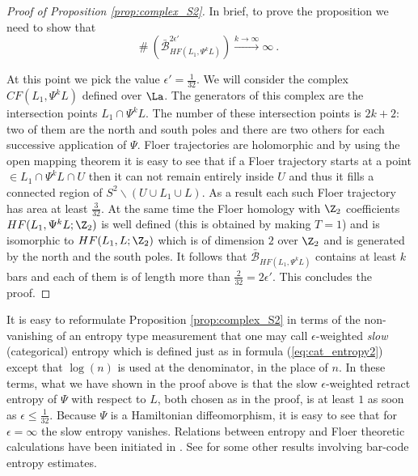 \begin{proof}[Proof of Proposition \ref{prop:complex_S2}]
 In brief, to prove the proposition we need to show that 
 \begin{equation}\label{eq:estimate_bars3}
 \#\  \left(\bar{\mathcal{B}}^{2\epsilon'}_{HF(L_{1},\Psi^{k}L)}\right)\stackrel{k\to\infty}{\longrightarrow} \infty ~.~
 \end{equation} 

At this point we pick the value  $\epsilon'= \frac{1}{32}$. We will consider the complex $CF(L_{1}, \Psi^{k}L)$ defined over $\La$. The generators of this complex  are the intersection points $L_{1}\cap \Psi^{k}L$. The number of these intersection points is $2k+2$: two of them
are the north and south poles and there are two others for each successive application of $\Psi$.  Floer trajectories are holomorphic and by using the open mapping theorem it is easy to see that if a Floer trajectory starts at a point $\in L_{1}\cap \Psi^{k}L \cap U$ then it  can not remain entirely inside $U$ and thus it fills a connected region of $S^{2}\backslash ( U \cup L_{1} \cup L)$. As a result each such Floer trajectory has area at least $\frac{3}{32}$. At the same time the Floer homology with $\Z_{2}$ coefficients $HF(L_{1}, \Psi^{k}L;\Z_{2})$ is well defined (this is obtained by making $T=1$) and is isomorphic
to $HF(L_{1}, L;\Z_{2})$ which is of dimension $2$ over $\Z_{2}$ and is generated by the north and the south poles. It follows that $\bar{\mathcal{B}}_{HF(L_{1},\Psi^{k}L)}$ contains at least $k$ bars and each of them is of length more than $\frac{2}{32}=2\epsilon'$. This concludes the proof.
\end{proof}


\begin{rem} \label{rem:equators1}
It is easy to reformulate Proposition \ref{prop:complex_S2} in terms of the non-vanishing of an entropy type measurement that one may call $\epsilon$-weighted  {\em slow} (categorical) entropy which is defined just as in formula (\ref{eq:cat_entropy2}) except that $\log (n)$ is used at the denominator, in the place of $n$. In these terms, what we have shown in the proof above is that the slow $\epsilon$-weighted retract entropy of $\Psi$ with respect to $L$, both chosen as in the proof, is  at least $1$ as soon as $\epsilon \leq \frac{1}{32}$. Because  $\Psi$ is a Hamiltonian diffeomorphism, it is easy to see that for $\epsilon=\infty$ the slow entropy vanishes. Relations between entropy and Floer theoretic calculations have been initiated in  \cite{FS:vol-growth}. See  \cite{DawFlBar} \cite{DawA3} for some other results involving bar-code entropy estimates.





\end{rem}